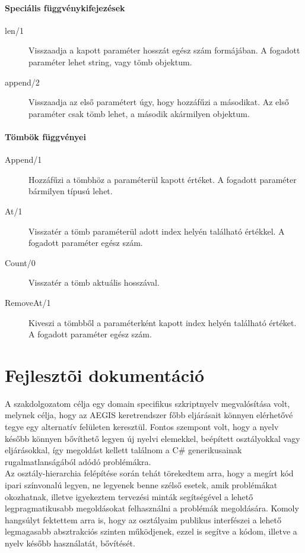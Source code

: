 \documentclass[a4paper,12pt]{report}
\begin{document}
\subsubsection{Speciális függvénykifejezések}
\begin{description}
\item[len/1] Visszaadja a kapott paraméter hosszát egész szám formájában. A fogadott paraméter lehet string, vagy tömb objektum.
\item[append/2] Visszaadja az első paramétert úgy, hogy hozzáfűzi a másodikat. Az első paraméter csak tömb lehet, a második akármilyen objektum.
\end{description}

\subsubsection{Tömbök függvényei}
\begin{description}
\item[Append/1] Hozzáfűzi a tömbhöz a paraméterül kapott értéket. A fogadott paraméter bármilyen típusú lehet.
\item[At/1] Visszatér a tömb paraméterül adott index helyén található értékkel. A fogadott paraméter egész szám.
\item[Count/0] Visszatér a tömb aktuális hosszával.
\item[RemoveAt/1] Kiveszi a tömbből a paraméterként kapott index helyén található értéket. A fogadott paraméter egész szám.
\end{description}




\chapter{Fejlesztõi dokumentáció}

A szakdolgozatom célja egy domain specifikus szkriptnyelv megvalósítása volt, melynek célja, hogy az AEGIS keretrendszer főbb eljárásait könnyen elérhetővé tegye egy alternatív felületen keresztül. Fontos szempont volt, hogy a nyelv később könnyen bővíthető legyen új nyelvi elemekkel, beépített osztályokkal vagy eljárásokkal, így megoldást kellett találnom a C\# generikusainak rugalmatlanságából adódó problémákra.\\

Az osztály-hierarchia felépítése során tehát törekedtem arra, hogy a megírt kód ipari színvonalú legyen, ne legyenek benne szélső esetek, amik problémákat okozhatnak, illetve igyekeztem tervezési minták segítségével a lehető legpragmatikusabb megoldásokat felhasználni a problémák megoldására. Komoly hangsúlyt fektettem arra is, hogy az osztályaim publikus interfészei a lehető legmagasabb absztrakciós szinten működjenek, ezzel is segítve a kódom, illetve a nyelv később használatát, bővítését. \\
\end{document}
